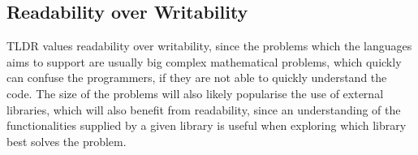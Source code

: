 \subsection{Readability over Writability}

TLDR values readability over writability, since the problems which the languages aims to support are usually big complex mathematical problems, which quickly can confuse the programmers, if they are not able to quickly understand the code. The size of the problems will also likely popularise the use of external libraries, which will also benefit from readability, since an understanding of the functionalities supplied by a given library is useful when exploring which library best solves the problem.





%
